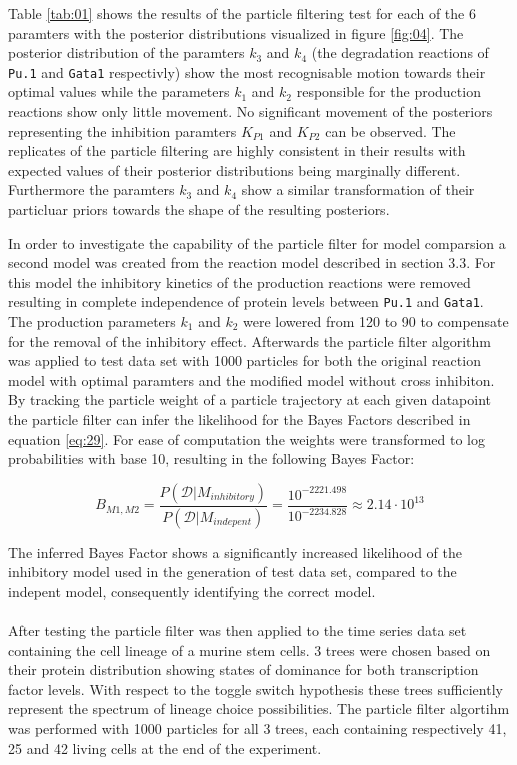 \documentclass{bioinfo}
\begin{document}
\vspace*{-12pt}

Table \ref{tab:01} shows the results of the particle filtering test for each of the 6 paramters with the posterior distributions visualized in figure \ref{fig:04}. The posterior distribution of the paramters $k_3$ and $k_4$ (the degradation reactions of \texttt{Pu.1} and \texttt{Gata1} respectivly) show the most recognisable motion towards their optimal values while the parameters $k_1$ and $k_2$ responsible for the production reactions show only little movement. No significant movement of the posteriors representing the inhibition paramters $K_{P1}$ and $K_{P2}$ can be observed. The replicates of the particle filtering are highly consistent in their results with expected values of their posterior distributions being marginally different. Furthermore the paramters $k_3$ and $k_4$ show a similar transformation of their particluar priors towards the shape of the resulting posteriors.


In order to investigate the capability of the particle filter for model comparsion a second model was created from the reaction model described in section 3.3. For this model the inhibitory kinetics of the production reactions were removed resulting in complete independence of protein levels between \texttt{Pu.1} and \texttt{Gata1}. The production parameters $k_1$ and $k_2$ were lowered from 120 to 90 to compensate for the removal of the inhibitory effect. Afterwards the particle filter algorithm was applied to test data set with 1000 particles for both the original reaction model with optimal paramters and the modified model without cross inhibiton. By tracking the particle weight of a particle trajectory at each given datapoint the particle filter can infer the likelihood for the Bayes Factors described in equation \ref{eq:29}. For ease of computation the weights were transformed to log probabilities with base 10, resulting in the following Bayes Factor:


\begin{equation}
B_{M1, M2} = \frac{P(\mathcal{D} | M_{inhibitory})}{P(\mathcal{D} | M_{indepent})} = \frac{10^{-2221.498}}{10^{-2234.828}} \approx 2.14 \cdot 10^{13} \label{eq:30}
\end{equation}

\vspace{15pt}

The inferred Bayes Factor shows a significantly increased likelihood of the inhibitory model used in the generation of test data set, compared to the indepent model, consequently identifying the correct model.
\\
\\ %
After testing the particle filter was then applied to the time series data set containing the cell lineage of a murine stem cells. 3 trees were chosen based on their protein distribution showing states of dominance for both transcription factor levels. With respect to the toggle switch hypothesis these trees sufficiently represent the spectrum of lineage choice possibilities. The particle filter algortihm was performed with 1000 particles for all 3 trees, each containing respectively 41, 25 and 42 living cells at the end of the experiment.
\end{document}
